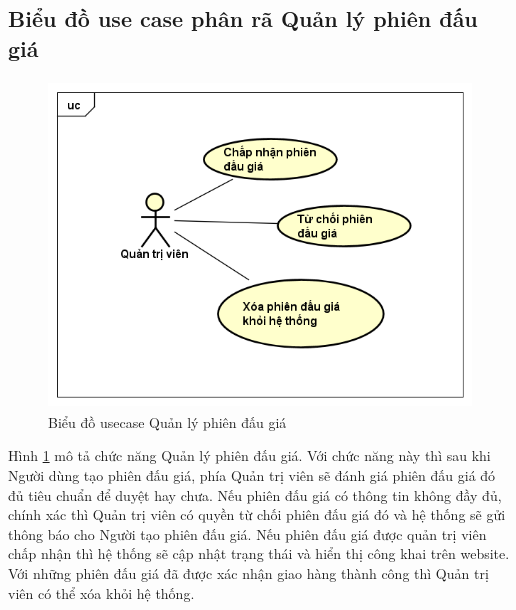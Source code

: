 \documentclass[../DoAn.tex]{subfiles}
\begin{document}
\subsection{Biểu đồ use case phân rã Quản lý phiên đấu giá}
\begin{figure}[H]
    \centering
    \includegraphics[width=11.4cm,height=8.67cm]{Hinhve/uc quản lý phiên đấu giá.png}
    \caption{Biểu đồ usecase Quản lý phiên đấu giá}
    \label{fig:Fig23}
\end{figure}
Hình \ref{fig:Fig23} mô tả chức năng Quản lý phiên đấu giá. Với chức năng này thì sau khi Người dùng tạo phiên đấu giá, phía Quản trị viên sẽ đánh giá phiên đấu giá đó đủ tiêu chuẩn để duyệt hay chưa. Nếu phiên đấu giá có thông tin không đầy đủ, chính xác thì Quản trị viên có quyền từ chối phiên đấu giá đó và hệ thống sẽ gửi thông báo cho Người tạo phiên đấu giá. Nếu phiên đấu giá được quản trị viên chấp nhận thì hệ thống sẽ cập nhật trạng thái và hiển thị công khai trên website. Với những phiên đấu giá đã được xác nhận giao hàng thành công thì Quản trị viên có thể xóa khỏi hệ thống.
\end{document}
